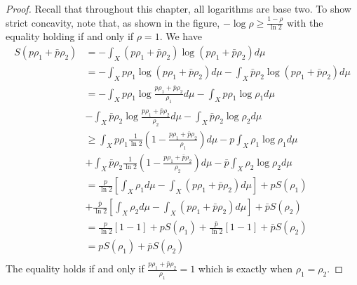 \begin{mathSection}
\begin{proof}
		Recall that throughout this chapter, all logarithms are base two. To show strict concavity, note that, as shown in the figure, $- \log \rho \geq \frac{1-\rho}{\ln 2}$ with the equality holding if and only if $\rho=1$. We have
		\begin{equation}
			\begin{aligned}
				S(p\rho_1 + \bar{p}\rho_2) &= - \int_X \left(p\rho_1 + \bar{p}\rho_2\right) \log \left(p\rho_1 + \bar{p}\rho_2\right) d\mu \\
				&= - \int_X p\rho_1 \log \left(p\rho_1 + \bar{p}\rho_2\right) d\mu - \int_X \bar{p}\rho_2 \log \left(p\rho_1 + \bar{p}\rho_2\right) d\mu \\
				&= - \int_X p\rho_1 \log \frac{p\rho_1 + \bar{p}\rho_2}{\rho_1} d\mu - \int_X p\rho_1 \log \rho_1 d\mu \\
				&- \int_X \bar{p}\rho_2 \log \frac{p\rho_1 + \bar{p}\rho_2}{\rho_2} d\mu - \int_X \bar{p}\rho_2 \log \rho_2 d\mu \\
				&\geq \int_X p\rho_1 \frac{1}{\ln 2} \left(1 - \frac{p\rho_1 + \bar{p}\rho_2}{\rho_1} \right)   d\mu - p \int_X \rho_1 \log \rho_1 d\mu \\
				&+ \int_X \bar{p}\rho_2 \frac{1}{\ln 2} \left(1 - \frac{p\rho_1 + \bar{p}\rho_2}{\rho_2} \right)   d\mu - \bar{p} \int_X \rho_2 \log \rho_2 d\mu \\
				&= \frac{p}{\ln 2}\left[ \int_X \rho_1 d\mu - \int_X \left(p\rho_1 + \bar{p}\rho_2\right) d\mu  \right] + p S(\rho_1) \\
				&+ \frac{\bar{p}}{\ln 2}\left[ \int_X \rho_2 d\mu - \int_X \left(p\rho_1 + \bar{p}\rho_2\right) d\mu  \right] + \bar{p} S(\rho_2) \\
				&= \frac{p}{\ln 2}\left[ 1 - 1  \right] + p S(\rho_1) + \frac{\bar{p}}{\ln 2}\left[ 1 - 1 \right] + \bar{p} S(\rho_2) \\
				&= p S(\rho_1) + \bar{p} S(\rho_2) \\
			\end{aligned}
		\end{equation}
		The equality holds if and only if $\frac{p\rho_1 + \bar{p}\rho_2}{\rho_1} = 1$ which is exactly when $\rho_1 = \rho_2$.
		
		


\end{proof}
\end{mathSection}
